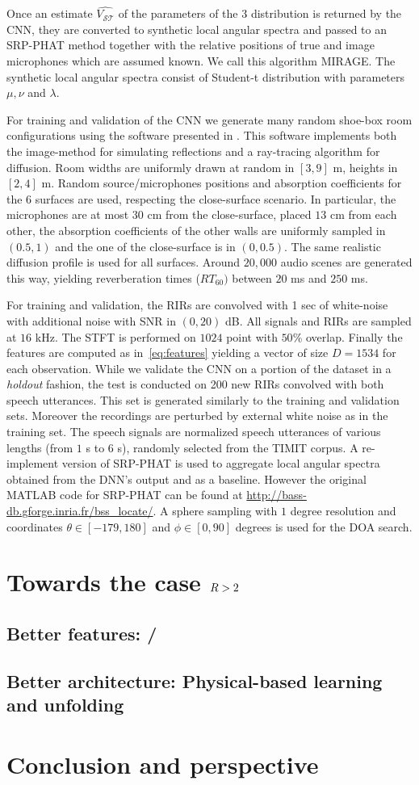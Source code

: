 Once an estimate $\hat{V_\mathcal{ST}}$ of the parameters of the 3 distribution is returned by the CNN, they are converted to synthetic local angular spectra and passed to an SRP-PHAT method together with the relative positions of true and image microphones which are assumed known. We call this algorithm MIRAGE. The synthetic local angular spectra consist of Student-t distribution with parameters $\mu, \nu$ and $\lambda$.

For training and validation of the CNN we generate many random shoe-box room configurations using the software presented in \cite{schimmel2009fast}. This software implements both the image-method for simulating reflections and a ray-tracing algorithm for diffusion. Room widths are uniformly drawn at random in $[3, 9]$ m, heights in $[2, 4]$ m. Random source/microphones positions and absorption coefficients for the 6 surfaces are used, respecting the close-surface scenario. In particular, the microphones are at most $30$ cm from the close-surface, placed $13$ cm from each other, the absorption coefficients of the other walls are uniformly sampled in $(0.5, 1)$ and the one of the close-surface is in $(0, 0.5)$. The same realistic diffusion profile \cite{gaultier2017vast} is used for all surfaces. Around $20,000$ audio scenes are generated this way, yielding reverberation times ($RT_{60})$ between $20$ ms and $250$ ms.

For training and validation, the RIRs are convolved with 1 sec of white-noise with additional noise with SNR in $(0,20)$ dB.
All signals and RIRs are sampled at $16$ kHz. The STFT is performed on $1024$ point with $50\%$ overlap. Finally the features are computed as in~\eqref{eq:features} yielding a vector of size $D = 1534$ for each observation.
While we validate the CNN on a portion of the dataset in a \textit{holdout} fashion, the test is conducted on 200 new RIRs convolved with both speech utterances. This set is generated similarly to the training and validation sets. Moreover the recordings are perturbed by external white noise as in the training set. The speech signals are normalized speech utterances of various lengths (from $1$ s to $6$ s), randomly selected from the TIMIT corpus.
A re-implement version of SRP-PHAT is used to aggregate local angular spectra obtained from the DNN's output and as a baseline. However the original MATLAB code for SRP-PHAT can be found at \url{http://bass-db.gforge.inria.fr/bss_locate/}. A sphere sampling with $1$ degree resolution and coordinates $\theta \in [-179, 180]$ and $\phi \in [0, 90]$ degrees is used for the DOA search.


\section{Towards the case $R > 2$}

\subsection{Better features: \RTF/}

\subsection{Better architecture: Physical-based learning and unfolding}

\section{Conclusion and perspective}
